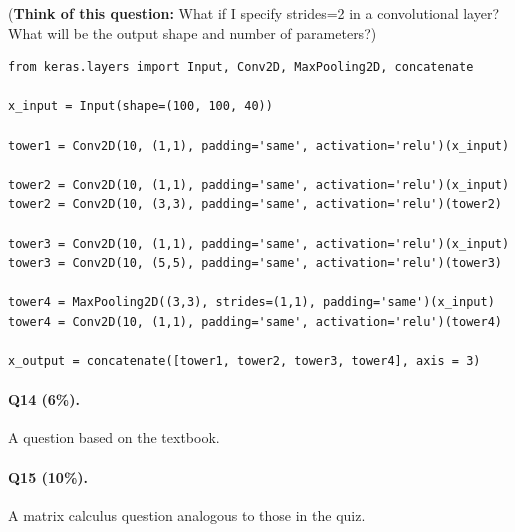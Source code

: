 \documentclass[11pt]{article}
\numberwithin{equation}{section}
\begin{document}
\noindent
(\textbf{Think of this question:} What if I specify \textsf{strides=2} in a convolutional layer? 
What will be the output shape and number of parameters?)



\begin{lstlisting}
from keras.layers import Input, Conv2D, MaxPooling2D, concatenate

x_input = Input(shape=(100, 100, 40))

tower1 = Conv2D(10, (1,1), padding='same', activation='relu')(x_input)

tower2 = Conv2D(10, (1,1), padding='same', activation='relu')(x_input)
tower2 = Conv2D(10, (3,3), padding='same', activation='relu')(tower2)

tower3 = Conv2D(10, (1,1), padding='same', activation='relu')(x_input)
tower3 = Conv2D(10, (5,5), padding='same', activation='relu')(tower3)

tower4 = MaxPooling2D((3,3), strides=(1,1), padding='same')(x_input)
tower4 = Conv2D(10, (1,1), padding='same', activation='relu')(tower4)

x_output = concatenate([tower1, tower2, tower3, tower4], axis = 3)
\end{lstlisting}
\vspace{3mm}




\paragraph{Q14 (6\%).} 
A question based on the textbook.



\paragraph{Q15 (10\%).} 
A matrix calculus question analogous to those in the quiz.




%

%
%
%
\end{document}
